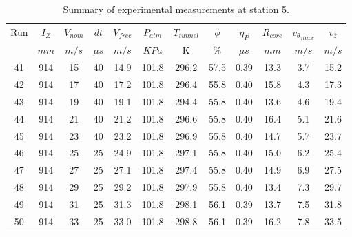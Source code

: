 \begin{table}[H]
\begin{center}
\begin{tabular}{|cccccccccccc|}
	\hline
	Run & $I_Z$ & $V_{nom}$ & $dt$ & $V_{free}$ & $P_{atm}$ & $T_{tunnel}$ & $\phi$ & $\eta_P$ & $R_{core}$ & $\overline{v_{\theta}}_{max}$ & $\overline{v_{\bar{z}}}$\\
	  & $mm$ & $m/s$ & $\mu s$ & $m/s$ & $KPa$ & K & $\%$ & $\mu s$ & $mm$ & $m/s$ & $m/s$\\
	\hline
	41 & 914 & 15 & 40 & 14.9 & 101.8 & 296.2 & 57.5 & 0.39 & 13.3 & 3.7 & 15.2\\
	42 & 914 & 17 & 40 & 17.2 & 101.8 & 296.4 & 55.8 & 0.40 & 15.8 & 4.3 & 17.3\\
	43 & 914 & 19 & 40 & 19.1 & 101.8 & 294.4 & 55.8 & 0.40 & 13.6 & 4.6 & 19.4\\
	44 & 914 & 21 & 40 & 21.2 & 101.8 & 296.6 & 55.8 & 0.40 & 16.4 & 5.1 & 21.6\\
	45 & 914 & 23 & 40 & 23.2 & 101.8 & 296.9 & 55.8 & 0.40 & 14.7 & 5.7 & 23.7\\
	46 & 914 & 25 & 25 & 24.9 & 101.8 & 297.1 & 55.8 & 0.40 & 15.0 & 6.2 & 25.4\\
	47 & 914 & 27 & 25 & 27.1 & 101.8 & 297.4 & 55.8 & 0.40 & 14.9 & 6.9 & 27.5\\
	48 & 914 & 29 & 25 & 29.2 & 101.8 & 297.9 & 55.8 & 0.40 & 13.4 & 7.3 & 29.7\\
	49 & 914 & 31 & 25 & 31.3 & 101.8 & 298.1 & 56.1 & 0.39 & 13.7 & 7.5 & 31.8\\
	50 & 914 & 33 & 25 & 33.0 & 101.8 & 298.8 & 56.1 & 0.39 & 16.2 & 7.8 & 33.5\\
	\hline
\end{tabular}
\caption{Summary of experimental measurements at station 5.}
\label{table:experiment_results_5}
\end{center}
\end{table}
